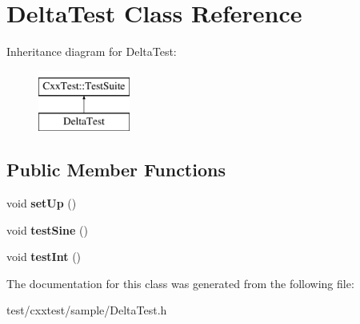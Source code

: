 \hypertarget{classDeltaTest}{\section{Delta\-Test Class Reference}
\label{classDeltaTest}
}
Inheritance diagram for Delta\-Test\-:\begin{figure}[H]
\begin{center}
\leavevmode
\includegraphics[height=2.000000cm]{classDeltaTest}
\end{center}
\end{figure}
\subsection*{Public Member Functions}
\begin{DoxyCompactItemize}
\item 
\hypertarget{classDeltaTest_ad18f9f106270d192a4df1e0287fbfcaa}{void {\bfseries set\-Up} ()}\label{classDeltaTest_ad18f9f106270d192a4df1e0287fbfcaa}

\item 
\hypertarget{classDeltaTest_ac0fe8b933d5f7796d6c2432b2451f0c6}{void {\bfseries test\-Sine} ()}\label{classDeltaTest_ac0fe8b933d5f7796d6c2432b2451f0c6}

\item 
\hypertarget{classDeltaTest_a166e8d778ce34a13012abc06c9e943e7}{void {\bfseries test\-Int} ()}\label{classDeltaTest_a166e8d778ce34a13012abc06c9e943e7}

\end{DoxyCompactItemize}


The documentation for this class was generated from the following file\-:\begin{DoxyCompactItemize}
\item 
test/cxxtest/sample/Delta\-Test.\-h\end{DoxyCompactItemize}
